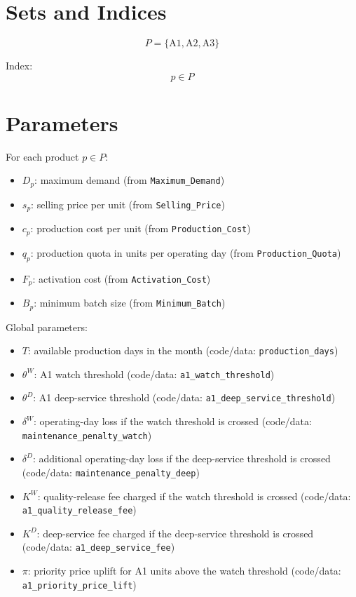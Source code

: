 \section*{Sets and Indices}

\[
P = \{\text{A1},\text{A2},\text{A3}\}
\]

Index:
\[
p \in P
\]

\section*{Parameters}

For each product \(p \in P\):
\begin{itemize}
    \item \(D_p\): maximum demand (from \texttt{Maximum\_Demand})
    \item \(s_p\): selling price per unit (from \texttt{Selling\_Price})
    \item \(c_p\): production cost per unit (from \texttt{Production\_Cost})
    \item \(q_p\): production quota in units per operating day (from \texttt{Production\_Quota})
    \item \(F_p\): activation cost (from \texttt{Activation\_Cost})
    \item \(B_p\): minimum batch size (from \texttt{Minimum\_Batch})
\end{itemize}

Global parameters:
\begin{itemize}
    \item \(T\): available production days in the month (code/data: \texttt{production\_days})
    \item \(\theta^{W}\): A1 watch threshold (code/data: \texttt{a1\_watch\_threshold})
    \item \(\theta^{D}\): A1 deep-service threshold (code/data: \texttt{a1\_deep\_service\_threshold})
    \item \(\delta^{W}\): operating-day loss if the watch threshold is crossed (code/data: \texttt{maintenance\_penalty\_watch})
    \item \(\delta^{D}\): additional operating-day loss if the deep-service threshold is crossed (code/data: \texttt{maintenance\_penalty\_deep})
    \item \(K^{W}\): quality-release fee charged if the watch threshold is crossed (code/data: \texttt{a1\_quality\_release\_fee})
    \item \(K^{D}\): deep-service fee charged if the deep-service threshold is crossed (code/data: \texttt{a1\_deep\_service\_fee})
    \item \(\pi\): priority price uplift for A1 units above the watch threshold (code/data: \texttt{a1\_priority\_price\_lift})
\end{itemize}

